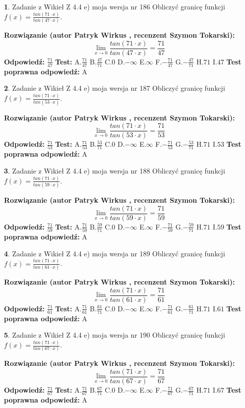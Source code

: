 \documentclass[12pt, a4paper]{article}
\theoremstyle{definition} %
\newtheorem{zad}{}
\newcommand{\zadStart}[1]{\begin{zad}#1\newline}
\newcommand{\zadStop}{\end{zad}}
\newcommand{\rozwStart}[2]{\noindent \textbf{Rozwiązanie (autor #1 , recenzent #2): }\newline}
\newcommand{\rozwStop}{\newline}
\newcommand{\odpStart}{\noindent \textbf{Odpowiedź:}\newline}
\newcommand{\odpStop}{\newline}
\newcommand{\testStart}{\noindent \textbf{Test:}\newline}
\newcommand{\testStop}{\newline}
\newcommand{\kluczStart}{\noindent \textbf{Test poprawna odpowiedź:}\newline}
\newcommand{\kluczStop}{\newline}
\begin{document}
\zadStart{Zadanie z Wikieł Z 4.4 e) moja wersja nr 186}
Obliczyć granicę funkcji $f(x)=\frac{tan(71\cdot x)}{tan(47\cdot x)}$.
\zadStop
\rozwStart{Patryk Wirkus}{Szymon Tokarski}
$$\lim\limits_{x\to 0}\frac{tan(71\cdot x)}{tan(47\cdot x)}=
\frac{71}{47}$$
\rozwStop
\odpStart
$\frac{71}{47}$
\odpStop
\testStart
A.$\frac{71}{47}$
B.$\frac{47}{71}$
C.$0$
D.$-\infty$
E.$\infty$
F.$-\frac{71}{47}$
G.$-\frac{47}{71}$
H.$71$
I.$47$
\testStop
\kluczStart
A
\kluczStop



\zadStart{Zadanie z Wikieł Z 4.4 e) moja wersja nr 187}
Obliczyć granicę funkcji $f(x)=\frac{tan(71\cdot x)}{tan(53\cdot x)}$.
\zadStop
\rozwStart{Patryk Wirkus}{Szymon Tokarski}
$$\lim\limits_{x\to 0}\frac{tan(71\cdot x)}{tan(53\cdot x)}=
\frac{71}{53}$$
\rozwStop
\odpStart
$\frac{71}{53}$
\odpStop
\testStart
A.$\frac{71}{53}$
B.$\frac{53}{71}$
C.$0$
D.$-\infty$
E.$\infty$
F.$-\frac{71}{53}$
G.$-\frac{53}{71}$
H.$71$
I.$53$
\testStop
\kluczStart
A
\kluczStop



\zadStart{Zadanie z Wikieł Z 4.4 e) moja wersja nr 188}
Obliczyć granicę funkcji $f(x)=\frac{tan(71\cdot x)}{tan(59\cdot x)}$.
\zadStop
\rozwStart{Patryk Wirkus}{Szymon Tokarski}
$$\lim\limits_{x\to 0}\frac{tan(71\cdot x)}{tan(59\cdot x)}=
\frac{71}{59}$$
\rozwStop
\odpStart
$\frac{71}{59}$
\odpStop
\testStart
A.$\frac{71}{59}$
B.$\frac{59}{71}$
C.$0$
D.$-\infty$
E.$\infty$
F.$-\frac{71}{59}$
G.$-\frac{59}{71}$
H.$71$
I.$59$
\testStop
\kluczStart
A
\kluczStop



\zadStart{Zadanie z Wikieł Z 4.4 e) moja wersja nr 189}
Obliczyć granicę funkcji $f(x)=\frac{tan(71\cdot x)}{tan(61\cdot x)}$.
\zadStop
\rozwStart{Patryk Wirkus}{Szymon Tokarski}
$$\lim\limits_{x\to 0}\frac{tan(71\cdot x)}{tan(61\cdot x)}=
\frac{71}{61}$$
\rozwStop
\odpStart
$\frac{71}{61}$
\odpStop
\testStart
A.$\frac{71}{61}$
B.$\frac{61}{71}$
C.$0$
D.$-\infty$
E.$\infty$
F.$-\frac{71}{61}$
G.$-\frac{61}{71}$
H.$71$
I.$61$
\testStop
\kluczStart
A
\kluczStop



\zadStart{Zadanie z Wikieł Z 4.4 e) moja wersja nr 190}
Obliczyć granicę funkcji $f(x)=\frac{tan(71\cdot x)}{tan(67\cdot x)}$.
\zadStop
\rozwStart{Patryk Wirkus}{Szymon Tokarski}
$$\lim\limits_{x\to 0}\frac{tan(71\cdot x)}{tan(67\cdot x)}=
\frac{71}{67}$$
\rozwStop
\odpStart
$\frac{71}{67}$
\odpStop
\testStart
A.$\frac{71}{67}$
B.$\frac{67}{71}$
C.$0$
D.$-\infty$
E.$\infty$
F.$-\frac{71}{67}$
G.$-\frac{67}{71}$
H.$71$
I.$67$
\testStop
\kluczStart
A
\kluczStop
\end{document}
